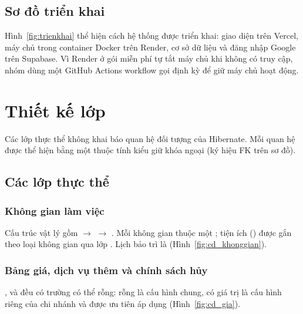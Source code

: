 \subsection{Sơ đồ triển khai}
\label{ssec:trienkhai_tong}
Hình~\ref{fig:trienkhai} thể hiện cách hệ thống được triển khai: giao diện trên Vercel, máy chủ trong container Docker trên Render, cơ sở dữ liệu và đăng nhập Google trên Supabase. Vì Render ở gói miễn phí tự tắt máy chủ khi không có truy cập, nhóm dùng một GitHub Actions workflow gọi  định kỳ để giữ máy chủ hoạt động.


\section{Thiết kế lớp}
\label{sec:thietke_lop}

Các lớp thực thể không khai báo quan hệ đối tượng của Hibernate. Mỗi quan hệ được thể hiện bằng một thuộc tính kiểu  giữ khóa ngoại (ký hiệu \guillemotleft FK\guillemotright{} trên sơ đồ).

\subsection{Các lớp thực thể}
\label{ssec:lop_mien}

\subsubsection{Không gian làm việc}
Cấu trúc vật lý gồm  $\rightarrow$  $\rightarrow$ . Mỗi không gian thuộc một ; tiện ích () được gắn theo loại không gian qua lớp . Lịch bảo trì là  (Hình~\ref{fig:cd_khonggian}).


\subsubsection{Bảng giá, dịch vụ thêm và chính sách hủy}
,  và  đều có trường  có thể rỗng: rỗng là cấu hình chung, có giá trị là cấu hình riêng của chi nhánh và được ưu tiên áp dụng (Hình~\ref{fig:cd_gia}).

